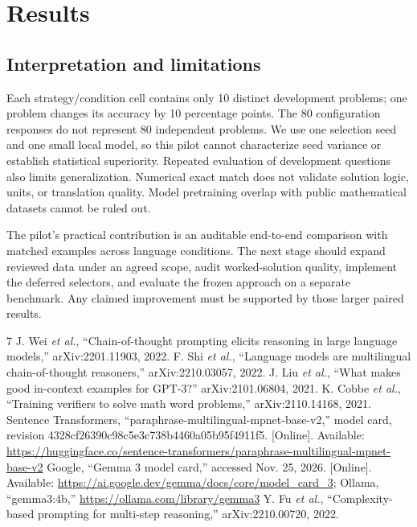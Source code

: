\documentclass[conference]{IEEEtran}
\begin{document}
\section{Results}


\subsection{Interpretation and limitations}
Each strategy/condition cell contains only 10 distinct development problems; one problem changes its accuracy by 10 percentage points. The 80 configuration responses do not represent 80 independent problems. We use one selection seed and one small local model, so this pilot cannot characterize seed variance or establish statistical superiority. Repeated evaluation of development questions also limits generalization. Numerical exact match does not validate solution logic, units, or translation quality. Model pretraining overlap with public mathematical datasets cannot be ruled out.

The pilot's practical contribution is an auditable end-to-end comparison with matched examples across language conditions. The next stage should expand reviewed data under an agreed scope, audit worked-solution quality, implement the deferred selectors, and evaluate the frozen approach on a separate benchmark. Any claimed improvement must be supported by those larger paired results.

\begin{thebibliography}{7}
 J. Wei \emph{et al.}, ``Chain-of-thought prompting elicits reasoning in large language models,'' arXiv:2201.11903, 2022.
 F. Shi \emph{et al.}, ``Language models are multilingual chain-of-thought reasoners,'' arXiv:2210.03057, 2022.
 J. Liu \emph{et al.}, ``What makes good in-context examples for GPT-3?'' arXiv:2101.06804, 2021.
 K. Cobbe \emph{et al.}, ``Training verifiers to solve math word problems,'' arXiv:2110.14168, 2021.
 Sentence Transformers, ``paraphrase-multilingual-mpnet-base-v2,'' model card, revision 4328cf26390c98c5e3c738b4460a05b95f4911f5. [Online]. Available: \url{https://huggingface.co/sentence-transformers/paraphrase-multilingual-mpnet-base-v2}
 Google, ``Gemma 3 model card,'' accessed Nov. 25, 2026. [Online]. Available: \url{https://ai.google.dev/gemma/docs/core/model_card_3}; Ollama, ``gemma3:4b,'' \url{https://ollama.com/library/gemma3}
 Y. Fu \emph{et al.}, ``Complexity-based prompting for multi-step reasoning,'' arXiv:2210.00720, 2022.
\end{thebibliography}
\end{document}
